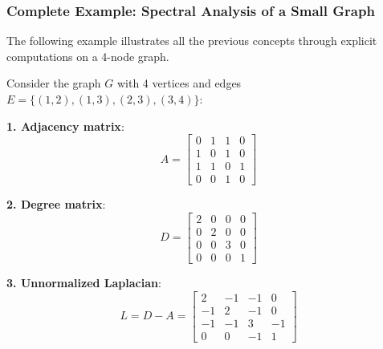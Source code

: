\subsubsection{Complete Example: Spectral Analysis of a Small Graph}

The following example illustrates all the previous concepts through explicit computations on a 4-node graph.

\begin{example}\label{ex:laplaciano_triangulo_4_nodos}
Consider the graph $G$ with 4 vertices and edges $E = \{(1,2), (1,3), (2,3), (3,4)\}$:

\begin{center}
\end{center}

\textbf{1. Adjacency matrix}:
\begin{equation}
A = \begin{bmatrix}
0 & 1 & 1 & 0 \\
1 & 0 & 1 & 0 \\
1 & 1 & 0 & 1 \\
0 & 0 & 1 & 0
\end{bmatrix}
\end{equation}

\textbf{2. Degree matrix}:
\begin{equation}
D = \begin{bmatrix}
2 & 0 & 0 & 0 \\
0 & 2 & 0 & 0 \\
0 & 0 & 3 & 0 \\
0 & 0 & 0 & 1
\end{bmatrix}
\end{equation}

\textbf{3. Unnormalized Laplacian}:
\begin{equation}
L = D - A = \begin{bmatrix}
2 & -1 & -1 & 0 \\
-1 & 2 & -1 & 0 \\
-1 & -1 & 3 & -1 \\
0 & 0 & -1 & 1
\end{bmatrix}
\end{equation}


\end{example}
